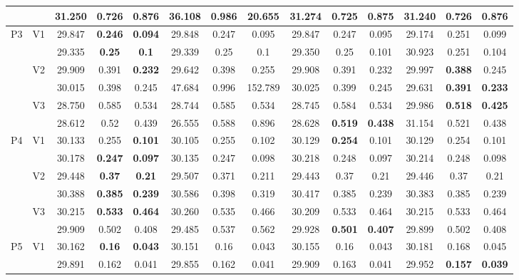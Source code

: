 \documentclass[12pt,a4paper]{article}
\begin{document}
\begin{sidewaystable}[ht]
{\begin{tabular}{cc|ccc|ccc|ccc|ccc|}
   &  & 31.250 & 0.726 & 0.876 & 36.108 & 0.986 & 20.655 & 31.274 & \textbf{0.725} & \textbf{0.875} & 31.240 & 0.726 & 0.876 \\ 
   \hline \hline\multirow{6}{*}{P3} & \multirow{2}{*}{V1} & 29.847 & \textbf{0.246} & \textbf{0.094} & 29.848 & 0.247 & 0.095 & 29.847 & 0.247 & 0.095 & 29.174 & 0.251 & 0.099 \\ 
   &  & 29.335 & \textbf{0.25} & \textbf{0.1} & 29.339 & 0.25 & 0.1 & 29.350 & 0.25 & 0.101 & 30.923 & 0.251 & 0.104 \\ 
   & \multirow{2}{*}{V2} & 29.909 & 0.391 & \textbf{0.232} & 29.642 & 0.398 & 0.255 & 29.908 & 0.391 & 0.232 & 29.997 & \textbf{0.388} & 0.245 \\ 
   &  & 30.015 & 0.398 & 0.245 & 47.684 & 0.996 & 152.789 & 30.025 & 0.399 & 0.245 & 29.631 & \textbf{0.391} & \textbf{0.233} \\ 
   & \multirow{2}{*}{V3} & 28.750 & 0.585 & 0.534 & 28.744 & 0.585 & 0.534 & 28.745 & 0.584 & 0.534 & 29.986 & \textbf{0.518} & \textbf{0.425} \\ 
   &  & 28.612 & 0.52 & 0.439 & 26.555 & 0.588 & 0.896 & 28.628 & \textbf{0.519} & \textbf{0.438} & 31.154 & 0.521 & 0.438 \\ 
   \hline \hline\multirow{6}{*}{P4} & \multirow{2}{*}{V1} & 30.133 & 0.255 & \textbf{0.101} & 30.105 & 0.255 & 0.102 & 30.129 & \textbf{0.254} & 0.101 & 30.129 & 0.254 & 0.101 \\ 
   &  & 30.178 & \textbf{0.247} & \textbf{0.097} & 30.135 & 0.247 & 0.098 & 30.218 & 0.248 & 0.097 & 30.214 & 0.248 & 0.098 \\ 
   & \multirow{2}{*}{V2} & 29.448 & \textbf{0.37} & \textbf{0.21} & 29.507 & 0.371 & 0.211 & 29.443 & 0.37 & 0.21 & 29.446 & 0.37 & 0.21 \\ 
   &  & 30.388 & \textbf{0.385} & \textbf{0.239} & 30.586 & 0.398 & 0.319 & 30.417 & 0.385 & 0.239 & 30.383 & 0.385 & 0.239 \\ 
   & \multirow{2}{*}{V3} & 30.215 & \textbf{0.533} & \textbf{0.464} & 30.260 & 0.535 & 0.466 & 30.209 & 0.533 & 0.464 & 30.215 & 0.533 & 0.464 \\ 
   &  & 29.909 & 0.502 & 0.408 & 29.485 & 0.537 & 0.562 & 29.928 & \textbf{0.501} & \textbf{0.407} & 29.899 & 0.502 & 0.408 \\ 
   \hline \hline\multirow{6}{*}{P5} & \multirow{2}{*}{V1} & 30.162 & \textbf{0.16} & \textbf{0.043} & 30.151 & 0.16 & 0.043 & 30.155 & 0.16 & 0.043 & 30.181 & 0.168 & 0.045 \\ 
   &  & 29.891 & 0.162 & 0.041 & 29.855 & 0.162 & 0.041 & 29.909 & 0.163 & 0.041 & 29.952 & \textbf{0.157} & \textbf{0.039} \\ 

\end{tabular}}
\end{sidewaystable}
\end{document}
